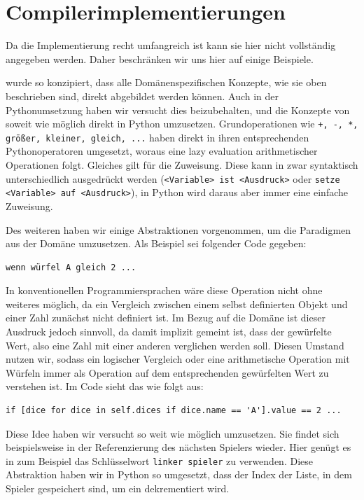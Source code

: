 \section{Compilerimplementierungen}
\label{sec:compilerimplementierungen}
	Da die Implementierung recht umfangreich ist kann sie hier nicht vollständig angegeben werden. Daher beschränken wir uns hier auf einige Beispiele.
	
\dg wurde so konzipiert, dass alle Domänenspezifischen Konzepte, wie sie oben beschrieben sind, direkt abgebildet werden können. Auch in der Pythonumsetzung haben wir versucht dies beizubehalten, und die Konzepte von \dg soweit wie möglich direkt in Python umzusetzen. Grundoperationen wie \texttt{+, -, *, größer, kleiner, gleich, ...} haben direkt in ihren entsprechenden Pythonoperatoren umgesetzt, woraus eine lazy evaluation arithmetischer Operationen folgt. Gleiches gilt für die Zuweisung. Diese kann in \dg zwar syntaktisch unterschiedlich ausgedrückt werden (\texttt{<Variable> ist <Ausdruck>} oder \texttt{setze <Variable> auf <Ausdruck>}), in Python wird daraus aber immer eine einfache Zuweisung.
	
		Des weiteren haben wir einige Abstraktionen vorgenommen, um die Paradigmen aus der Domäne umzusetzen. Als Beispiel sei folgender Code gegeben:
\begin{lstlisting}
wenn würfel A gleich 2 ...
\end{lstlisting}
		In konventionellen Programmiersprachen wäre diese Operation nicht ohne weiteres möglich, da ein Vergleich zwischen einem selbst definierten Objekt und einer Zahl zunächst nicht definiert ist. Im Bezug auf die Domäne ist dieser Ausdruck jedoch sinnvoll, da damit implizit gemeint ist, dass der gewürfelte Wert, also eine Zahl mit einer anderen verglichen werden soll. Diesen Umstand nutzen wir, sodass ein logischer Vergleich oder eine arithmetische Operation mit Würfeln immer als Operation auf dem entsprechenden gewürfelten Wert zu verstehen ist. Im Code sieht das wie folgt aus:

\begin{lstlisting}
if [dice for dice in self.dices if dice.name == 'A'].value == 2 ...
\end{lstlisting}
Diese Idee haben wir versucht so weit wie möglich umzusetzen. Sie findet sich beispielsweise in der Referenzierung des nächsten Spielers wieder. Hier genügt es in \dg zum Beispiel das Schlüsselwort \texttt{linker spieler} zu verwenden. Diese Abstraktion haben wir in Python so umgesetzt, dass der Index der Liste, in dem Spieler gespeichert sind, um ein dekrementiert wird.

